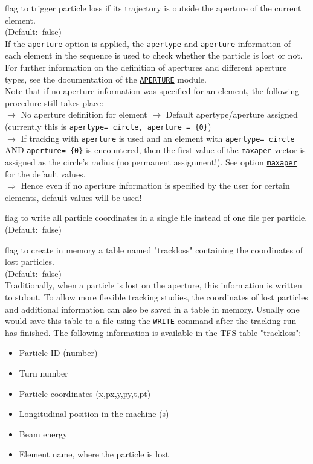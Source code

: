 \begin{madlist}
   flag to trigger particle loss if its trajectory is
  outside the aperture of the current element. \\ 
  (Default:~false) \\
  If the \texttt{aperture} option is applied, the \texttt{apertype} 
  and \texttt{aperture} information of each element in the sequence
  is used to check whether the particle is lost or not. For further
  information on the definition of apertures and different aperture
  types, see the documentation of the
  \hyperref[chap:aperture]{\tt APERTURE} module. \\  
  Note that if no aperture information was specified for an element, 
  the following procedure still takes place:
  \\
  $\rightarrow$ No aperture definition for element $\rightarrow$ 
  Default apertype/aperture assigned (currently this is   
  \texttt{apertype= circle, aperture = \{0\}}) 
  \\ $\rightarrow$  
  If tracking with \texttt{aperture} is used and an
  element with \texttt{apertype= circle} AND \texttt{aperture= \{0\}}  
  is encountered, then the first value of the \texttt{maxaper} vector
  is assigned as the circle's radius (no permanent assignment!). 
  See option \hyperlink{run}{\texttt{maxaper}} for the default values. 
  \\ $\Rightarrow$
  Hence even if no aperture information is specified by the user for
  certain elements, default values will be used! 


   flag to write all particle coordinates in a single
  file instead of one file per particle. \\ (Default:~false)

   flag to create in memory a table named "trackloss"
  containing the coordinates of lost particles.\\
  (Default:~false) \\
  Traditionally, when a particle is lost on the aperture, this information
  is written to stdout. To allow more flexible tracking studies, the
  coordinates of lost particles and additional information can also be
  saved in a table in memory. Usually one would save this table to a
  file using the \texttt{WRITE} command after the tracking run has
  finished. The following information is available in the TFS table
  "trackloss":          
  \begin{itemize}
  \item Particle ID (number)
  \item Turn number
  \item Particle coordinates (x,px,y,py,t,pt)
  \item Longitudinal position in the machine (s)
  \item Beam energy
  \item Element name, where the particle is lost
  \end{itemize}


\end{madlist}

